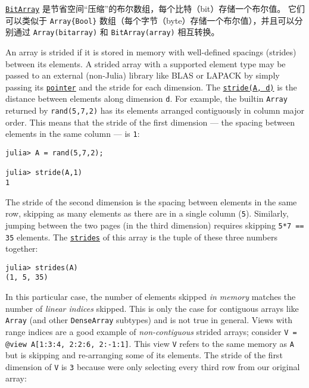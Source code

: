 \hyperlink{18015155802543401629}{\texttt{BitArray}} 是节省空间“压缩”的布尔数组，每个比特（bit）存储一个布尔值。 它们可以类似于 \texttt{Array\{Bool\}} 数组（每个字节（byte）存储一个布尔值），并且可以分别通过 \texttt{Array(bitarray)} 和 \texttt{BitArray(array)} 相互转换。



An array is {\textquotedbl}strided{\textquotedbl} if it is stored in memory with well-defined spacings (strides) between its elements. A strided array with a supported element type may be passed to an external (non-Julia) library like BLAS or LAPACK by simply passing its \hyperlink{8901246211940014300}{\texttt{pointer}} and the stride for each dimension. The \hyperlink{97811245619734938}{\texttt{stride(A, d)}} is the distance between elements along dimension \texttt{d}. For example, the builtin \texttt{Array} returned by \texttt{rand(5,7,2)} has its elements arranged contiguously in column major order. This means that the stride of the first dimension — the spacing between elements in the same column — is \texttt{1}:




\begin{verbatim}
julia> A = rand(5,7,2);

julia> stride(A,1)
1
\end{verbatim}



The stride of the second dimension is the spacing between elements in the same row, skipping as many elements as there are in a single column (\texttt{5}). Similarly, jumping between the two {\textquotedbl}pages{\textquotedbl} (in the third dimension) requires skipping \texttt{5*7 == 35} elements.  The \hyperlink{13576557637670855932}{\texttt{strides}} of this array is the tuple of these three numbers together:




\begin{verbatim}
julia> strides(A)
(1, 5, 35)
\end{verbatim}



In this particular case, the number of elements skipped \emph{in memory} matches the number of \emph{linear indices} skipped. This is only the case for contiguous arrays like \texttt{Array} (and other \texttt{DenseArray} subtypes) and is not true in general. Views with range indices are a good example of \emph{non-contiguous} strided arrays; consider \texttt{V = @view A[1:3:4, 2:2:6, 2:-1:1]}. This view \texttt{V} refers to the same memory as \texttt{A} but is skipping and re-arranging some of its elements. The stride of the first dimension of \texttt{V} is \texttt{3} because we{\textquotesingle}re only selecting every third row from our original array:




